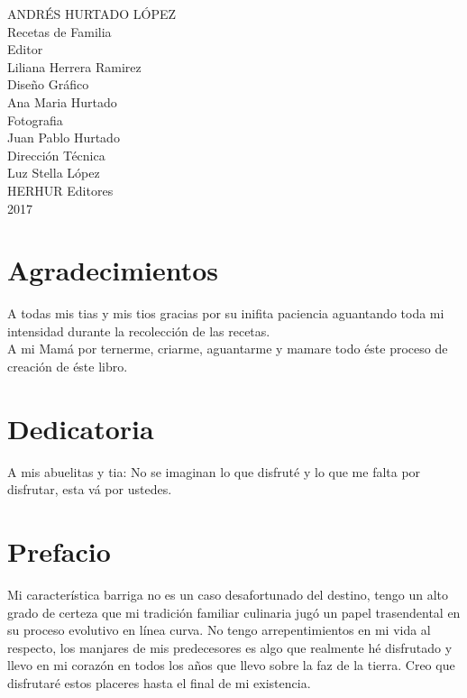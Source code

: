 \documentclass[letterpaper]{book}
\begin{document}
\author{Andrés Hurtado López}
\date{2017}
\begin{titlepage}
  \begin{center}
    \large
    ANDRÉS HURTADO LÓPEZ \\
    \vspace*{3cm}
    \Huge{Recetas de Familia} \\
    \vspace*{3cm}
    \normalsize
    Editor\\
    Liliana Herrera Ramirez\\
    \vspace*{1cm}
    Diseño Gráfico\\
    Ana Maria Hurtado\\
    \vspace*{1cm}
    Fotografia \\
    Juan Pablo Hurtado\\
    \vspace*{1cm}
    Dirección Técnica \\
    Luz Stella López\\
    \vspace*{4.5cm}
    HERHUR Editores\\
    2017\\
  \end{center}
\end{titlepage}
\frontmatter
\chapter{Agradecimientos}
A todas mis tias y mis tios gracias por su inifita paciencia aguantando toda mi intensidad durante la recolección de las recetas. \\

A mi Mamá por ternerme, criarme, aguantarme y mamare todo éste proceso de creación de éste libro.
\chapter{Dedicatoria}
A mis abuelitas y tia: No se imaginan lo que disfruté y lo que me falta por disfrutar, esta vá por ustedes.
\chapter{Prefacio}
Mi característica barriga no es un caso desafortunado del destino, tengo un alto grado de certeza que mi tradición familiar culinaria jugó un papel trasendental en su proceso evolutivo en línea curva. No tengo arrepentimientos en mi vida al respecto, los manjares de mis predecesores es algo que realmente hé disfrutado y llevo en mi corazón en todos los años que llevo sobre la faz de la tierra. Creo que disfrutaré estos placeres hasta el final de mi existencia.\\
\end{document}
